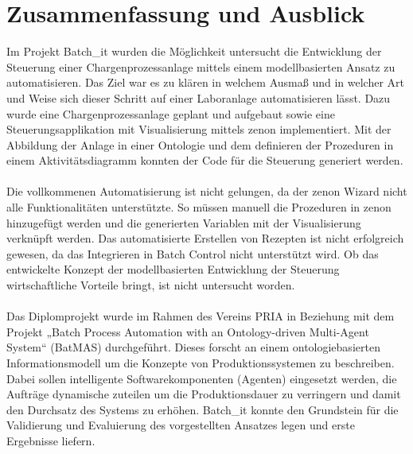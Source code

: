 

\chapter{Zusammenfassung und Ausblick} \label{chapter:conclusion}

Im Projekt Batch\_it wurden die Möglichkeit untersucht die Entwicklung der Steuerung einer Chargenprozessanlage mittels einem modellbasierten Ansatz zu automatisieren. Das Ziel war es zu klären in welchem Ausmaß und in welcher Art und Weise sich dieser Schritt auf einer Laboranlage automatisieren lässt. Dazu wurde eine Chargenprozessanlage geplant und aufgebaut sowie eine Steuerungsapplikation mit Visualisierung mittels zenon implementiert. 
Mit der Abbildung der Anlage in einer Ontologie und dem definieren der Prozeduren in einem Aktivitätsdiagramm konnten der Code für die Steuerung generiert werden. \\\\
Die vollkommenen Automatisierung ist nicht gelungen, da der zenon Wizard nicht alle Funktionalitäten unterstützte. So müssen manuell die Prozeduren in zenon hinzugefügt werden und die generierten Variablen mit der Visualisierung verknüpft werden. Das automatisierte Erstellen von Rezepten ist nicht erfolgreich gewesen, da das Integrieren in Batch Control nicht unterstützt wird. Ob das entwickelte Konzept der modellbasierten Entwicklung der Steuerung wirtschaftliche Vorteile bringt, ist nicht untersucht worden. \\\\
Das Diplomprojekt wurde im Rahmen des Vereins PRIA in Beziehung mit dem Projekt „Batch Process Automation with an On\-to\-lo\-gy-driven Multi-Agent System“ (BatMAS) durchgeführt. Dieses forscht an einem ontologiebasierten Informationsmodell um die Konzepte von Produktionssystemen zu beschreiben. Dabei sollen intelligente Softwarekomponenten (Agenten) eingesetzt werden, die Aufträge dynamische zuteilen um die Produktionsdauer zu verringern und damit den Durchsatz des Systems zu erhöhen. Batch\_it konnte den Grundstein für die Validierung und Evaluierung des vorgestellten Ansatzes legen und erste Ergebnisse liefern.\\\\
